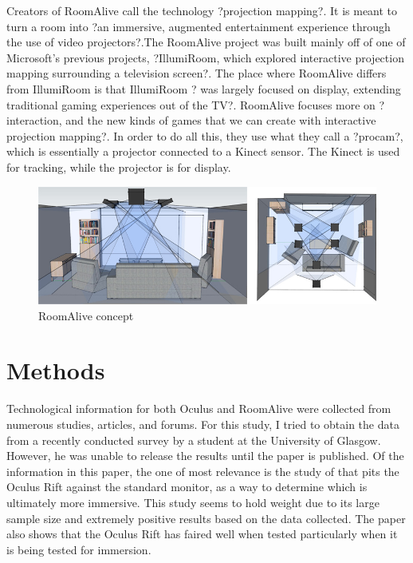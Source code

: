 \documentclass[a4paper]{article}
\begin{document}
\indent Creators of RoomAlive call the technology ?projection mapping?. It is meant to turn a room into ?an immersive, augmented entertainment experience through the use of video projectors?\cite{6}.The RoomAlive project was built mainly off of one of Microsoft's previous projects, ?IllumiRoom, which explored interactive projection mapping surrounding a television screen?\cite{6}. The place where RoomAlive differs from IllumiRoom is that IllumiRoom ? was largely focused on display, extending traditional gaming experiences out of the TV?\cite{6}. RoomAlive focuses more on ?interaction, and the new kinds of games that we can create with interactive projection mapping?\cite{6}. In order to do all this, they use what they call a ?procam?, which is essentially a projector connected to a Kinect sensor. The Kinect is used for tracking, while the projector is for display.


\begin{figure}
\centering
\includegraphics[scale=0.4]{roomalive.jpg}
\caption{RoomAlive concept}
\end{figure}



\section{Methods}

\indent\indent Technological information for both Oculus and RoomAlive were collected from numerous studies, articles, and forums. For this study, I tried to obtain the data from a recently conducted survey\cite{8} by a student at the University of Glasgow. However, he was unable to release the results until the paper is published. Of the information in this paper, the one of most relevance is the study of that pits the Oculus Rift against the standard monitor, as a way to determine which is ultimately more immersive. This study seems to hold weight due to its large sample size and extremely positive results based on the data collected. The paper also shows that the Oculus Rift has faired well when tested particularly when it is being tested for immersion.
\end{document}

